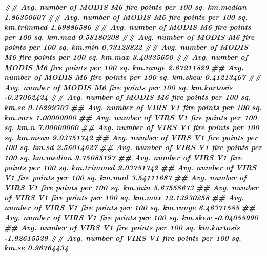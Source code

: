\documentclass[10pt,landscape,a3paper]{article}
\newenvironment{Shaded}{\begin{snugshade}}{\end{snugshade}}
\newcommand{\DocumentationTok}[1]{\textcolor[rgb]{0.56,0.35,0.01}{\textbf{\textit{#1}}}}
\begin{document}
\begin{Shaded}
\begin{Highlighting}[]
\DocumentationTok{\#\# Avg. number of MODIS M6 fire points per 100 sq. km.median            1.86350607}
\DocumentationTok{\#\# Avg. number of MODIS M6 fire points per 100 sq. km.trimmed           1.69886586}
\DocumentationTok{\#\# Avg. number of MODIS M6 fire points per 100 sq. km.mad               0.58180208}
\DocumentationTok{\#\# Avg. number of MODIS M6 fire points per 100 sq. km.min               0.73123822}
\DocumentationTok{\#\# Avg. number of MODIS M6 fire points per 100 sq. km.max               3.40335650}
\DocumentationTok{\#\# Avg. number of MODIS M6 fire points per 100 sq. km.range             2.67211829}
\DocumentationTok{\#\# Avg. number of MODIS M6 fire points per 100 sq. km.skew              0.41213467}
\DocumentationTok{\#\# Avg. number of MODIS M6 fire points per 100 sq. km.kurtosis         {-}0.27062424}
\DocumentationTok{\#\# Avg. number of MODIS M6 fire points per 100 sq. km.se                0.16299707}
\DocumentationTok{\#\# Avg. number of VIRS V1 fire points per 100 sq. km.vars               1.00000000}
\DocumentationTok{\#\# Avg. number of VIRS V1 fire points per 100 sq. km.n                  7.00000000}
\DocumentationTok{\#\# Avg. number of VIRS V1 fire points per 100 sq. km.mean               9.03751742}
\DocumentationTok{\#\# Avg. number of VIRS V1 fire points per 100 sq. km.sd                 2.56014627}
\DocumentationTok{\#\# Avg. number of VIRS V1 fire points per 100 sq. km.median             9.75085197}
\DocumentationTok{\#\# Avg. number of VIRS V1 fire points per 100 sq. km.trimmed            9.03751742}
\DocumentationTok{\#\# Avg. number of VIRS V1 fire points per 100 sq. km.mad                3.54111687}
\DocumentationTok{\#\# Avg. number of VIRS V1 fire points per 100 sq. km.min                5.67558673}
\DocumentationTok{\#\# Avg. number of VIRS V1 fire points per 100 sq. km.max               12.13930258}
\DocumentationTok{\#\# Avg. number of VIRS V1 fire points per 100 sq. km.range              6.46371585}
\DocumentationTok{\#\# Avg. number of VIRS V1 fire points per 100 sq. km.skew              {-}0.04055990}
\DocumentationTok{\#\# Avg. number of VIRS V1 fire points per 100 sq. km.kurtosis          {-}1.92615529}
\DocumentationTok{\#\# Avg. number of VIRS V1 fire points per 100 sq. km.se                 0.96764434}


\end{Highlighting}
\end{Shaded}
\end{document}
